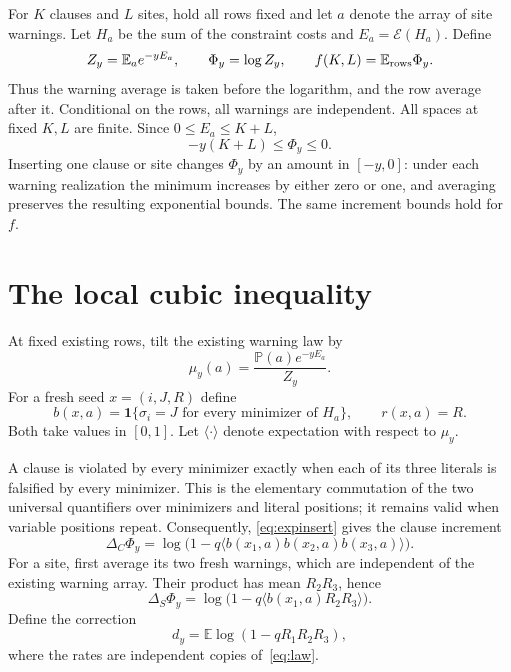 \documentclass[11pt]{article}
\theoremstyle{remark}
\newcommand{\E}{\mathbb{E}}
\newcommand{\Prob}{\mathbb{P}}
\newcommand{\ind}{\mathbf{1}}
\newcommand{\en}{\mathcal{E}}
\begin{document}
For $K$ clauses and $L$ sites, hold all rows fixed and let $a$ denote the
array of site warnings. Let $H_a$ be the sum of the constraint costs and
$E_a=\en(H_a)$. Define
\begin{equation}\label{eq:functional}
 Z_y=\E_a e^{-yE_a},\qquad \Phi_y=\log Z_y,\qquad
 f(K,L)=\E_{\rm rows}\Phi_y.
\end{equation}
Thus the warning average is taken before the logarithm, and the row
average after it. Conditional on the rows, all warnings are independent.
All spaces at fixed $K,L$ are finite. Since $0\leq E_a\leq K+L$,
\begin{equation}\label{eq:growth}
 -y(K+L)\leq\Phi_y\leq0.
\end{equation}
Inserting one clause or site changes $\Phi_y$ by an amount in $[-y,0]$:
under each warning realization the minimum increases by either zero or
one, and averaging preserves the resulting exponential bounds.
The same increment bounds hold for $f$.

\section{The local cubic inequality}
At fixed existing rows, tilt the existing warning law by
\[
 \mu_y(a)=\frac{\Prob(a)e^{-yE_a}}{Z_y}.
\]
For a fresh seed $x=(i,J,R)$ define
\[
 b(x,a)=\ind\{\sigma_i=J\text{ for every minimizer of }H_a\},
 \qquad r(x,a)=R.
\]
Both take values in $[0,1]$. Let $\langle\cdot\rangle$ denote expectation
with respect to $\mu_y$.

A clause is violated by every minimizer exactly when each of its three
literals is falsified by every minimizer. This is the elementary
commutation of the two universal quantifiers over minimizers and literal
positions; it remains valid when variable positions repeat. Consequently,
\eqref{eq:expinsert} gives the clause increment
\begin{equation}\label{eq:clause}
 \Delta_C\Phi_y=\log\bigl(1-q\langle b(x_1,a)b(x_2,a)b(x_3,a)\rangle\bigr).
\end{equation}
For a site, first average its two fresh warnings, which are independent
of the existing warning array. Their product has mean $R_2R_3$, hence
\begin{equation}\label{eq:site}
 \Delta_S\Phi_y=\log\bigl(1-q\langle b(x_1,a)R_2R_3\rangle\bigr).
\end{equation}
Define the correction
\begin{equation}\label{eq:dy}
 d_y=\E\log(1-qR_1R_2R_3),
\end{equation}
where the rates are independent copies of~\eqref{eq:law}.
\end{document}
